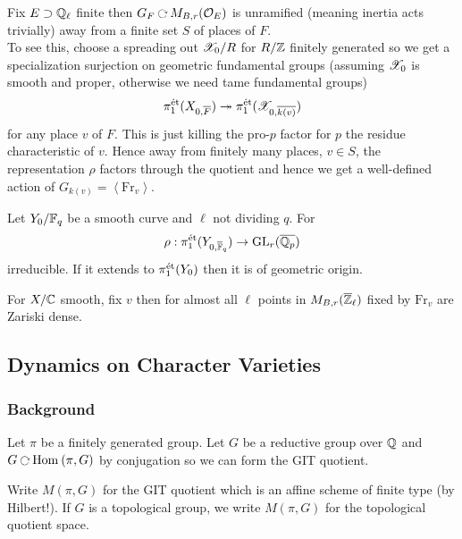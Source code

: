 \documentclass[12pt]{article}
\begin{document}
\begin{rmk}
Fix $E \supset \mathbb{Q}_{\ell}$ finite then $G_F \acts M_{B,r}(\struct{E})$ is unramified (meaning inertia acts trivially) away from a finite set $S$ of places of $F$. 
\\
To see this, choose a spreading out $\mathscr{X}_0 / R$ for $R / \mathbb{Z}$ finitely generated so we get a specialization surjection on geometric fundamental groups (assuming $\mathscr{X}_0$ is smooth and proper, otherwise we need tame fundamental groups)
\[ \pi_1^{\text{\'{e}t}}(X_{0,\overline{F}}) \twoheadrightarrow \pi_1^{\text{\'{e}t}}(\mathscr{X}_{0, \overline{k(v)}}) \]
for any place $v$ of $F$. This is just killing the pro-$p$ factor for $p$ the residue characteristic of $v$. Hence away from finitely many places, $v \in S$, the representation $\rho$ factors through the quotient and hence we get a well-defined action of $G_{k(v)} = \left< \mathrm{Fr}_v \right>$. 
\end{rmk}

\begin{theorem} 
Let $Y_0 / \mathbb{F}_q$ be a smooth curve and $\ell$ not dividing $q$. For 
\[ \rho : \pi_1^{\text{\'{e}t}}(Y_{0, \overline{\mathbb{F}}_q}) \to \mathrm{GL}_r(\overline{\mathbb{Q}_p}) \]
irreducible. If it extends to $\pi_1^{\text{\'{e}t}}(Y_0)$ then it is of geometric origin. 
\end{theorem}

\begin{theorem}
For $X / \mathbb{C}$ smooth, fix $v$ then for almost all $\ell$ points in $M_{B,r}(\overline{\mathbb{Z}}_\ell)$ fixed by $\mathrm{Fr}_v$ are Zariski dense.
\end{theorem}

\subsection{Dynamics on Character Varieties}


\subsubsection{Background}

Let $\pi$ be a finitely generated group. Let $G$ be a reductive group over $\mathbb{Q}$ and $G \acts \Hom{}{\pi}{G}$ by conjugation so we can form the GIT quotient.

\begin{defn}
Write $M(\pi, G)$ for the GIT quotient which is an affine scheme of finite type (by Hilbert!). If $G$ is a topological group, we write $M(\pi, G)$ for the topological quotient space.
\end{defn}
\end{document}
